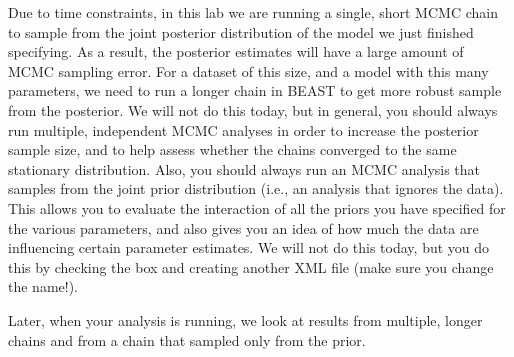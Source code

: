 {    Due to time constraints, in this lab we are running a single, short
    MCMC chain to sample from the joint posterior distribution of the model we
    just finished specifying.
    As a result, the posterior estimates will have a large amount of
    MCMC sampling error.
    For a dataset of this size, and a model with this many parameters, we need
    to run a longer chain in BEAST to get more robust sample from the
    posterior.
    We will not do this today, but in general, you should always run multiple,
    independent MCMC analyses in order to increase the posterior sample size,
    and to help assess whether the chains converged to the same stationary
    distribution.
    Also, you should always run an MCMC analysis that samples from the joint
    prior distribution (i.e., an analysis that ignores the data).  This allows
    you to evaluate the interaction of all the priors you have specified for
    the various parameters, and also gives you an idea of how much the data are
    influencing certain parameter estimates.
    We will not do this today, but you do this by checking the  box and creating another XML file
    (make sure you change the name!).

    Later, when your analysis is running, we look at results from multiple,
    longer chains and from a chain that sampled only from the prior.
}




